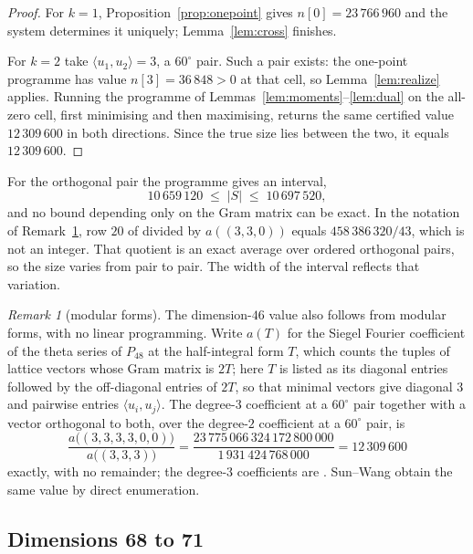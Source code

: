 \documentclass[11pt]{amsart}
\theoremstyle{remark}
\newtheorem{remark}[theorem]{Remark}
\newcommand{\Pff}{P_{48}}
\newcommand{\ip}[2]{\langle #1,#2\rangle}
\begin{document}
\begin{proof}
For $k=1$, Proposition~\ref{prop:onepoint} gives $n[0]=23\,766\,960$ and the
system determines it uniquely; Lemma~\ref{lem:cross} finishes.

For $k=2$ take $\ip{u_1}{u_2}=3$, a $60^\circ$ pair. Such a pair exists: the
one-point programme has value $n[3]=36\,848>0$ at that cell, so
Lemma~\ref{lem:realize} applies. Running the programme of Lemmas~\ref{lem:moments}--\ref{lem:dual} on
the all-zero cell, first minimising and then maximising, returns the same
certified value $12\,309\,600$ in both directions. Since the true size lies
between the two, it equals $12\,309\,600$.
\end{proof}

For the orthogonal pair the programme gives an interval,
\[
  10\,659\,120 \;\le\; |S| \;\le\; 10\,697\,520,
\]
and no bound depending only on the Gram matrix can be exact. In the notation of
Remark~\ref{rem:ozeki}, row $20$ of \cite[Table 3]{ozeki2016} divided by
$a((3,3,0))$ equals $458\,386\,320/43$, which is not an integer. That quotient is
an exact average over ordered orthogonal pairs, so the size varies from pair to
pair. The width of the interval reflects that variation.

\begin{remark}[modular forms]\label{rem:ozeki}
The dimension-$46$ value also follows from modular forms, with no linear
programming. Write $a(T)$ for the Siegel Fourier coefficient of the theta series
of $\Pff$ at the half-integral form $T$, which counts the tuples of lattice
vectors whose Gram matrix is $2T$; here $T$ is listed as its diagonal entries
followed by the off-diagonal entries of $2T$, so that minimal vectors give
diagonal $3$ and pairwise entries $\ip{u_i}{u_j}$. The degree-$3$ coefficient at
a $60^\circ$ pair together with a vector orthogonal to both, over the degree-$2$
coefficient at a $60^\circ$ pair, is
\[
  \frac{a\bigl((3,3,3,3,0,0)\bigr)}{a\bigl((3,3,3)\bigr)}
  = \frac{23\,775\,066\,324\,172\,800\,000}{1\,931\,424\,768\,000}
  = 12\,309\,600
\]
exactly, with no remainder; the degree-$3$ coefficients are
\cite[Table 3]{ozeki2016}. Sun--Wang \cite{sun-wang2026} obtain the same value by
direct enumeration.
\end{remark}

\subsection{Dimensions 68 to 71}\label{ss:g72}
\end{document}
